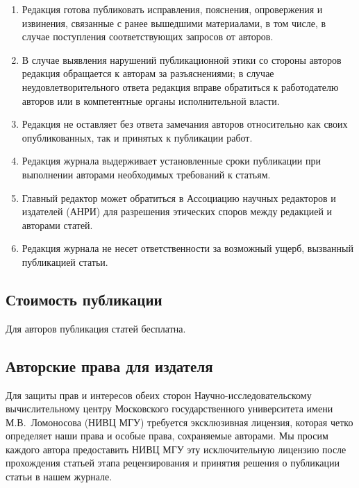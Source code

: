 \documentclass[10pt,a4paper]{book}
\begin{document}
\begin{enumerate}[itemsep=0pt,parsep=2pt,topsep=2pt,partopsep=0pt]
\item Редакция готова публиковать исправления, пояснения, опровержения и извинения,
      связанные с ранее вышедшими материалами, в том числе, в случае поступления
      соответствующих запросов от авторов.
\item В случае выявления нарушений публикационной этики со стороны авторов 
      редакция обращается к авторам за разъяснениями; в случае неудовлетворительного 
      ответа редакция вправе обратиться к работодателю авторов или в 
      компетентные органы исполнительной власти.
\item Редакция не оставляет без ответа замечания авторов относительно как своих
      опубликованных, так и принятых к публикации работ.
\item Редакция журнала выдерживает установленные сроки публикации при выполнении авторами
      необходимых требований к статьям.
\item Главный редактор может обратиться в Ассоциацию научных редакторов и издателей (АНРИ)
      для разрешения этических споров между редакцией и авторами статей.
\item Редакция журнала не несет ответственности за возможный ущерб, вызванный публикацией
      статьи.
\end{enumerate}


\subsection{Стоимость публикации} 
Для авторов публикация статей бесплатна.

\subsection{Авторские права для издателя} 
Для защиты прав и интересов обеих сторон Научно-исследо\-ва\-тель\-скому вычислительному центру
Московского государственного университета имени М.В.~Ломоносова (НИВЦ МГУ) требуется
эксклюзивная лицензия, которая четко определяет наши права и особые права, сохраняемые
авторами. Мы просим каждого автора предоставить НИВЦ МГУ эту исключительную лицензию после
прохождения статьей этапа рецензирования и принятия решения о публикации статьи в нашем
журнале.
\end{document}
